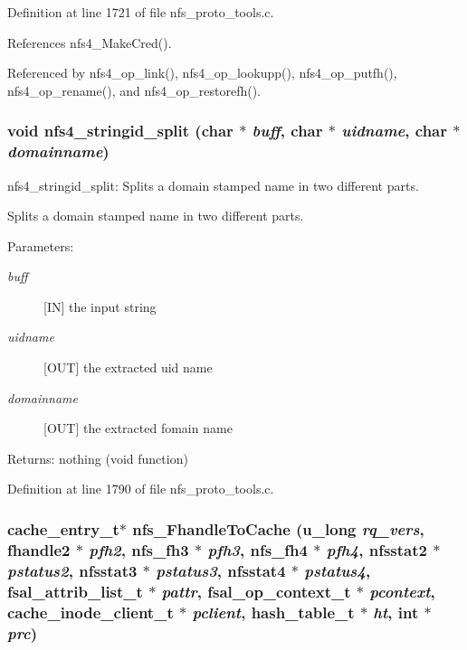 Definition at line 1721 of file nfs\_\-proto\_\-tools.c.

References nfs4\_\-Make\-Cred().

Referenced by nfs4\_\-op\_\-link(), nfs4\_\-op\_\-lookupp(), nfs4\_\-op\_\-putfh(), nfs4\_\-op\_\-rename(), and nfs4\_\-op\_\-restorefh().
\subsubsection{\setlength{\rightskip}{0pt plus 5cm}void nfs4\_\-stringid\_\-split (char $\ast$ {\em buff}, char $\ast$ {\em uidname}, char $\ast$ {\em domainname})}\label{nfs__proto__tools_8c_a12}


nfs4\_\-stringid\_\-split: Splits a domain stamped name in two different parts.

Splits a domain stamped name in two different parts.

\begin{Desc}
\item[Parameters:]
\begin{description}
\item[{\em buff}][IN] the input string \item[{\em uidname}][OUT] the extracted uid name \item[{\em domainname}][OUT] the extracted fomain name\end{description}
\end{Desc}
\begin{Desc}
\item[Returns:]nothing (void function) \end{Desc}


Definition at line 1790 of file nfs\_\-proto\_\-tools.c.
\subsubsection{\setlength{\rightskip}{0pt plus 5cm}cache\_\-entry\_\-t$\ast$ nfs\_\-Fhandle\-To\-Cache (u\_\-long {\em rq\_\-vers}, fhandle2 $\ast$ {\em pfh2}, nfs\_\-fh3 $\ast$ {\em pfh3}, nfs\_\-fh4 $\ast$ {\em pfh4}, nfsstat2 $\ast$ {\em pstatus2}, nfsstat3 $\ast$ {\em pstatus3}, nfsstat4 $\ast$ {\em pstatus4}, fsal\_\-attrib\_\-list\_\-t $\ast$ {\em pattr}, fsal\_\-op\_\-context\_\-t $\ast$ {\em pcontext}, cache\_\-inode\_\-client\_\-t $\ast$ {\em pclient}, hash\_\-table\_\-t $\ast$ {\em ht}, int $\ast$ {\em prc})}\label{nfs__proto__tools_8c_a1}


